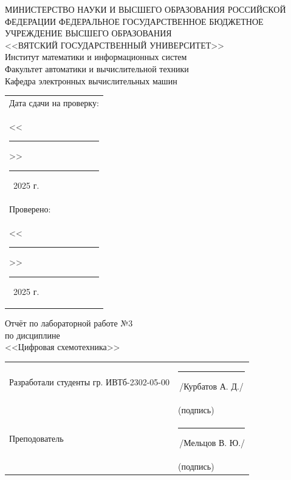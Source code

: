\documentclass[oneside,a4paper,14pt]{extarticle}
\begin{document}
\newpage
\thispagestyle{empty}
\begin{center}
  МИНИСТЕРСТВО НАУКИ И ВЫСШЕГО ОБРАЗОВАНИЯ РОССИЙСКОЙ ФЕДЕРАЦИИ ФЕДЕРАЛЬНОЕ ГОСУДАРСТВЕННОЕ БЮДЖЕТНОЕ УЧРЕЖДЕНИЕ ВЫСШЕГО ОБРАЗОВАНИЯ\\
  <<ВЯТСКИЙ ГОСУДАРСТВЕННЫЙ УНИВЕРСИТЕТ>>\\
  Институт математики и информационных систем\\
  Факультет автоматики и вычислительной техники\\
  Кафедра электронных вычислительных машин
\end{center}
\vspace{10mm}

\hfill
\begin{tabular}{l}
  \footnotesize Дата сдачи на проверку:                                          \\
  \footnotesize <<\rule[-1mm]{5mm}{0.10mm}\/>>\rule[-1mm]{20mm}{0.10mm}\ 2025 г. \\
  \footnotesize Проверено:                                                       \\
  \footnotesize <<\rule[-1mm]{5mm}{0.10mm}\/>>\rule[-1mm]{20mm}{0.10mm}\ 2025 г. \\
\end{tabular}
\vfill

\begin{center}
  Отчёт по лабораторной работе №3\\
  по дисциплине\\
  <<Цифровая схемотехника>>\\
\end{center}
\vspace{25mm}
\noindent
\begin{tabular}{ll}
  Разработали студенты гр. ИВТб-2302-05-00 & \hspace{5mm}\rule[-1mm]{30mm}{0.10mm}\,/Курбатов А. Д./ \\
                                           & \hspace{12.5mm}\footnotesize(подпись)                   \\
  Преподователь                            & \hspace{5mm}\rule[-1mm]{30mm}{0.10mm}\,/Мельцов В. Ю./  \\
                                           & \hspace{12.5mm}\footnotesize(подпись)                   \\
\end{tabular}
\end{document}
